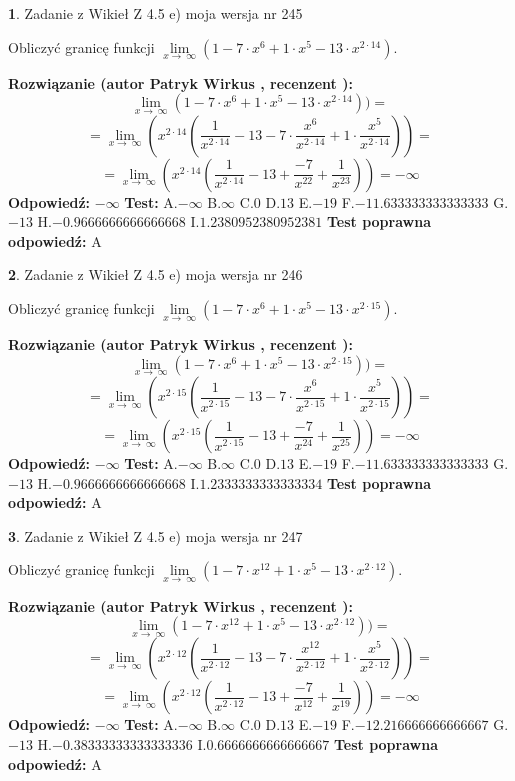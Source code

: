 \documentclass[12pt, a4paper]{article}
\theoremstyle{definition} %
\newtheorem{zad}{}
\newcommand{\zadStart}[1]{\begin{zad}#1\newline}
\newcommand{\zadStop}{\end{zad}}
\newcommand{\rozwStart}[2]{\noindent \textbf{Rozwiązanie (autor #1 , recenzent #2): }\newline}
\newcommand{\rozwStop}{\newline}
\newcommand{\odpStart}{\noindent \textbf{Odpowiedź:}\newline}
\newcommand{\odpStop}{\newline}
\newcommand{\testStart}{\noindent \textbf{Test:}\newline}
\newcommand{\testStop}{\newline}
\newcommand{\kluczStart}{\noindent \textbf{Test poprawna odpowiedź:}\newline}
\newcommand{\kluczStop}{\newline}
\begin{document}
\zadStart{Zadanie z Wikieł Z 4.5 e) moja wersja nr 245}


Obliczyć granicę funkcji  $\lim\limits_{x\to\ \infty}(1 - 7 \cdot x^{6}+1 \cdot x^{5}- 13 \cdot x^{2\cdot14})$.
\zadStop
\rozwStart{Patryk Wirkus}{}
$$\lim\limits_{x\to\ \infty}(1 - 7 \cdot x^{6}+1 \cdot x^{5}- 13 \cdot x^{2\cdot14}))=$$
$$=\lim\limits_{x\to\ \infty}(x^{2\cdot14}(\frac{1}{x^{2\cdot14}}-13 -7 \cdot \frac{x^{6}}{x^{2\cdot14}}+1 \cdot \frac{x^{5}}{x^{2\cdot14}}))=$$
$$=\lim\limits_{x\to\ \infty}(x^{2\cdot14}(\frac{1}{x^{2\cdot14}}-13 + \frac{-7}{x^{22}}+ \frac{1}{x^{23}}))=-\infty$$
\rozwStop
\odpStart
$-\infty$
\odpStop
\testStart
A.$-\infty$ B.$\infty$ C.$0$ D.$13$ E.$-19$
F.$-11.633333333333333$ G.$-13$
H.$-0.9666666666666668$
I.$1.2380952380952381$
\testStop
\kluczStart
A
\kluczStop



\zadStart{Zadanie z Wikieł Z 4.5 e) moja wersja nr 246}


Obliczyć granicę funkcji  $\lim\limits_{x\to\ \infty}(1 - 7 \cdot x^{6}+1 \cdot x^{5}- 13 \cdot x^{2\cdot15})$.
\zadStop
\rozwStart{Patryk Wirkus}{}
$$\lim\limits_{x\to\ \infty}(1 - 7 \cdot x^{6}+1 \cdot x^{5}- 13 \cdot x^{2\cdot15}))=$$
$$=\lim\limits_{x\to\ \infty}(x^{2\cdot15}(\frac{1}{x^{2\cdot15}}-13 -7 \cdot \frac{x^{6}}{x^{2\cdot15}}+1 \cdot \frac{x^{5}}{x^{2\cdot15}}))=$$
$$=\lim\limits_{x\to\ \infty}(x^{2\cdot15}(\frac{1}{x^{2\cdot15}}-13 + \frac{-7}{x^{24}}+ \frac{1}{x^{25}}))=-\infty$$
\rozwStop
\odpStart
$-\infty$
\odpStop
\testStart
A.$-\infty$ B.$\infty$ C.$0$ D.$13$ E.$-19$
F.$-11.633333333333333$ G.$-13$
H.$-0.9666666666666668$
I.$1.2333333333333334$
\testStop
\kluczStart
A
\kluczStop



\zadStart{Zadanie z Wikieł Z 4.5 e) moja wersja nr 247}


Obliczyć granicę funkcji  $\lim\limits_{x\to\ \infty}(1 - 7 \cdot x^{12}+1 \cdot x^{5}- 13 \cdot x^{2\cdot12})$.
\zadStop
\rozwStart{Patryk Wirkus}{}
$$\lim\limits_{x\to\ \infty}(1 - 7 \cdot x^{12}+1 \cdot x^{5}- 13 \cdot x^{2\cdot12}))=$$
$$=\lim\limits_{x\to\ \infty}(x^{2\cdot12}(\frac{1}{x^{2\cdot12}}-13 -7 \cdot \frac{x^{12}}{x^{2\cdot12}}+1 \cdot \frac{x^{5}}{x^{2\cdot12}}))=$$
$$=\lim\limits_{x\to\ \infty}(x^{2\cdot12}(\frac{1}{x^{2\cdot12}}-13 + \frac{-7}{x^{12}}+ \frac{1}{x^{19}}))=-\infty$$
\rozwStop
\odpStart
$-\infty$
\odpStop
\testStart
A.$-\infty$ B.$\infty$ C.$0$ D.$13$ E.$-19$
F.$-12.216666666666667$ G.$-13$
H.$-0.38333333333333336$
I.$0.6666666666666667$
\testStop
\kluczStart
A
\kluczStop
\end{document}
